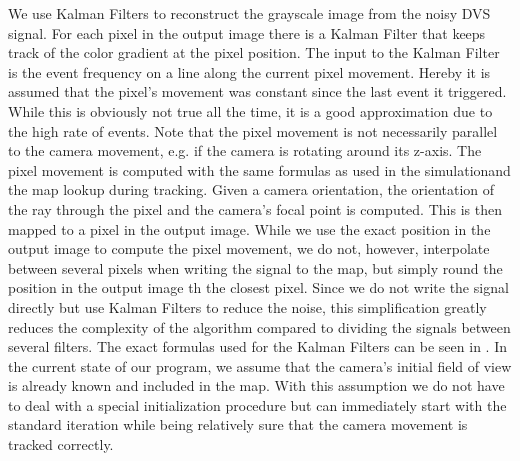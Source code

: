 We use Kalman Filters to reconstruct the grayscale image from the noisy DVS signal. For each pixel in the output image there is a Kalman Filter that keeps track of the color gradient at the pixel position. The input to the Kalman Filter is the event frequency on a line along the current pixel movement. Hereby it is assumed that the pixel's movement was constant since the last event it triggered. While this is obviously not true all the time, it is a good approximation due to the high rate of events. Note that the pixel movement is not necessarily parallel to the camera movement, e.g. if the camera is rotating around its z-axis.
The pixel movement is computed with the same formulas as used in the simulationand the map lookup during tracking. Given a camera orientation, the orientation of the ray through the pixel and the camera's focal point is computed. This is then mapped to a pixel in the output image. While we use the exact position in the output image to compute the pixel movement,  we do not, however, interpolate between several pixels when writing the signal to the map, but simply round the position in the output image th the closest pixel. Since we do not write the signal directly but use Kalman Filters to reduce the noise, this simplification greatly reduces the complexity of the algorithm compared to dividing the signals between several filters.
The exact formulas used for the Kalman Filters can be seen in \cite{kim2014simultaneous}.
In the current state of our program, we assume that the camera's initial field of view is already known and included in the map. With this assumption we do not have to deal with a special initialization procedure but can immediately start with the standard iteration while being relatively sure that the camera movement is tracked correctly.
